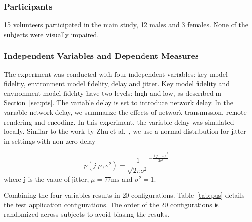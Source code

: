 \subsubsection{Participants}

15 volunteers participated in the main study, 12 males and 3 females. None of the subjects were visually impaired.

\subsubsection{Independent Variables and Dependent Measures}
\label{sec:ms:ivdm}

The experiment was conducted with four independent variables: key model fidelity, environment model fidelity, delay and jitter.
Key model fidelity and environment model fidelity have two levels: high and low, as described in Section~\ref{sec:pts}.
The variable delay is set to introduce network delay. In the variable network delay, we summarize the effects of network transmission, remote rendering and encoding. In this experiment, the variable delay was simulated locally. Similar to the work by Zhu et al.~\cite{zhu1998jitter}, we use a normal distribution for jitter in settings with non-zero delay

\begin{equation}
p(j|\mu,\sigma^{2})=\frac{1}{\sqrt{2\pi\sigma^{2}}}^{-\frac{(j-\mu)^{2}}{2\sigma^{2}}}
\end{equation}
where j is the value of jitter, $\mu=77\mathrm{ms}$ and $\sigma^{2}=1$.

Combining the four variables results in 20 configurations. Table~\ref{tab:pus} details the test application configurations. The order of the 20 configurations is randomized across subjects to avoid biasing the results.

